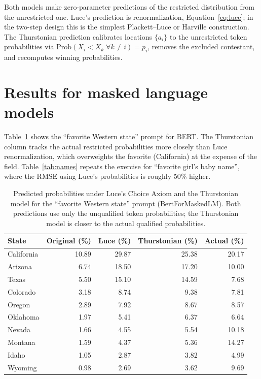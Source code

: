 \documentclass[11pt]{article}
\begin{document}
Both models make zero-parameter predictions of the restricted
distribution from the unrestricted one. Luce's prediction is
renormalization, Equation~\eqref{eq:luce}; in the two-step design this is
the simplest Plackett--Luce \cite{plackett1975} or Harville
\cite{harville1973} construction. The Thurstonian prediction calibrates
locations $\{a_i\}$ to the unrestricted token probabilities via
$\mathrm{Prob}(X_i < X_k \;\forall k \neq i) = p_i$, removes the excluded
contestant, and recomputes winning probabilities.

\section{Results for masked language models}
\label{sec:maskedresults}

Table~\ref{tab:western} shows the ``favorite Western state'' prompt for
BERT. The Thurstonian column tracks the actual restricted probabilities
more closely than Luce renormalization, which overweights the favorite
(California) at the expense of the field. Table~\ref{tab:names} repeats
the exercise for ``favorite girl's baby name'', where the RMSE using
Luce's probabilities is roughly 50\% higher.

\begin{table}[ht]
\centering
\begin{tabular}{lrrrr}
\toprule
State & Original (\%) & Luce (\%) & Thurstonian (\%) & Actual (\%) \\
\midrule
California & 10.89 & 29.87 & 25.38 & 20.17 \\
Arizona    &  6.74 & 18.50 & 17.20 & 10.00 \\
Texas      &  5.50 & 15.10 & 14.59 &  7.68 \\
Colorado   &  3.18 &  8.74 &  9.38 &  7.81 \\
Oregon     &  2.89 &  7.92 &  8.67 &  8.57 \\
Oklahoma   &  1.97 &  5.41 &  6.37 &  6.64 \\
Nevada     &  1.66 &  4.55 &  5.54 & 10.18 \\
Montana    &  1.59 &  4.37 &  5.36 & 14.27 \\
Idaho      &  1.05 &  2.87 &  3.82 &  4.99 \\
Wyoming    &  0.98 &  2.69 &  3.62 &  9.69 \\
\bottomrule
\end{tabular}
\caption{Predicted probabilities under Luce's Choice Axiom and the
Thurstonian model for the ``favorite Western state'' prompt
(BertForMaskedLM). Both predictions use only the unqualified token
probabilities; the Thurstonian model is closer to the actual qualified
probabilities.}
\label{tab:western}
\end{table}
\end{document}
